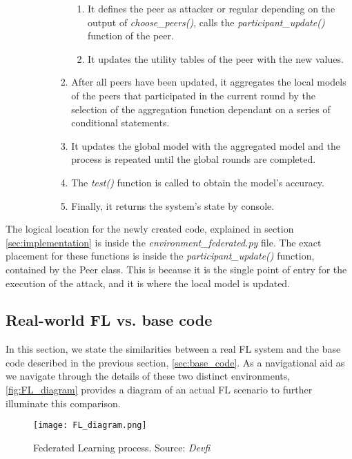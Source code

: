 \begin{itemize}
\begin{itemize}
\begin{itemize}
\begin{enumerate}
                                \begin{enumerate}
                                        \item It defines the peer as attacker or regular depending on the output of \textit{choose\_peers()}, calls the \textit{participant\_update()} function of the peer.
                                        \item It updates the utility tables of the peer with the new values.
                                \end{enumerate}
                                \item After all peers have been updated, it aggregates the local models of the peers that participated in the current round by the selection of the aggregation function dependant on a series of conditional statements.
                                \item It updates the global model with the aggregated model and the process is repeated until the global rounds are completed.
                                \item The \textit{test()} function is called to obtain the model's accuracy.
                                \item Finally, it returns the system's state by console.
                        \end{enumerate}
                \end{itemize}
        \end{itemize}
\end{itemize}
The logical location for the newly created code, explained in section \ref{sec:implementation} is inside the \textit{environment\_federated.py} file. The exact placement for these functions is inside the \textit{participant\_update()} function, contained by the Peer class.
This is because it is the single point of entry for the execution of the attack, and it is where the local model is updated.

\subsection{Real-world FL vs. base code}
In this section, we state the similarities between a real FL system and the base code described in the previous section, \ref{sec:base_code}. As a navigational aid as we navigate through the details of these two distinct environments, \autoref{fig:FL_diagram} provides a diagram of an actual FL scenario to further illuminate this comparison. 
\begin{figure}[h!]
        \centering %
        \texttt{[image: FL\_diagram.png]}
        \caption{Federated Learning process. Source: \textit{Devfi}} %
        \label{fig:FL_diagram}
\end{figure}

